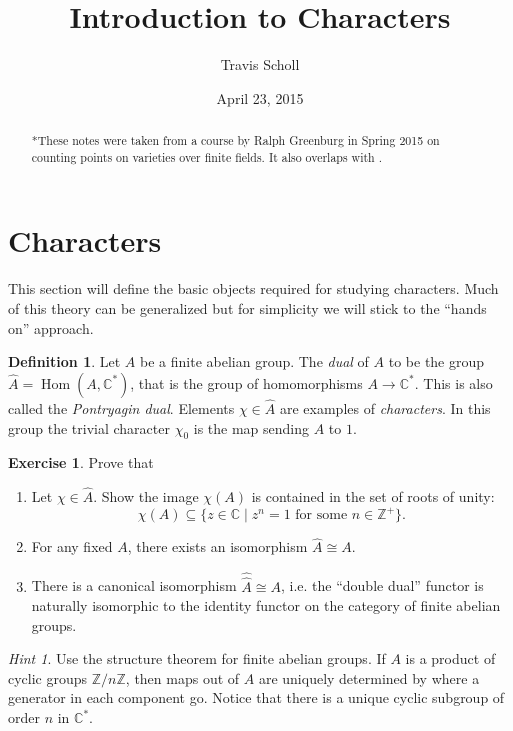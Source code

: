 \documentclass[11pt]{article}
\date{April 23, 2015}
\newcommand{\BB}[1]{\mathbb{#1}} %
\newcommand{\CC}{\BB{C}}
\newcommand{\ZZ}{\BB{Z}}
\newcommand{\st}{\mid}
\newcommand{\Hom}{\operatorname{Hom}}
\renewcommand{\hat}{\widehat}
\theoremstyle{plain}
\theoremstyle{definition}
\newtheorem{defn}[definitioncounter]{Definition}
\newtheorem{excer}[exercisecounter]{Exercise}
\theoremstyle{remark}
\newtheorem*{hint}{Hint}
\newcommand{\mytitle}{Introduction to Characters}
\newcommand{\myauthor}{Travis Scholl}
\begin{document}
\title{\bfseries\sffamily \mytitle}
\author{\sc \myauthor }
\maketitle

\begin{abstract}
	*These notes were taken from a course by Ralph Greenburg in Spring 2015 \cite{ralphscourse} on counting points on varieties over finite fields. It also overlaps with \cite[Ch. VI]{serre2012course}.
\end{abstract}

\section{Characters}
\hfill

This section will define the basic objects required for studying characters. Much of this theory can be generalized but for simplicity we will stick to the ``hands on'' approach.

\begin{defn}
	Let $A$ be a finite abelian group. The \emph{dual} of $A$ to be the group $\hat{A} = \Hom(A,\CC^*)$, that is the group of homomorphisms $A \to \CC^*$. This is also called the \emph{Pontryagin dual}. Elements $\chi\in\hat{A}$ are examples of \emph{characters}. In this group the trivial character $\chi_0$ is the map sending $A$ to $1$.
\end{defn}

\begin{excer}\label{ex:charbasics}
	Prove that
	\begin{enumerate}[label=(\alph*)]
		\item Let $\chi\in\hat{A}$. Show the image $\chi(A)$ is contained in the set of roots of unity:
		$$
			\chi(A) \subseteq \{z\in\CC \st z^n=1 \text{ for some $n\in\ZZ^+$}\}.
		$$
		\item For any fixed $A$, there exists an isomorphism $\hat{A} \cong A$.
		\item There is a canonical isomorphism $\hat{\hat{A}} \cong A$, i.e. the ``double dual'' functor is naturally isomorphic to the identity functor on the category of finite abelian groups.
	\end{enumerate}
	\begin{hint}
		Use the structure theorem for finite abelian groups. If $A$ is a product of cyclic groups $\ZZ/n\ZZ$, then maps out of $A$ are uniquely determined by where a generator in each component go. Notice that there is a unique cyclic subgroup of order $n$ in $\CC^*$.
	\end{hint}
\end{excer}
\end{document}
